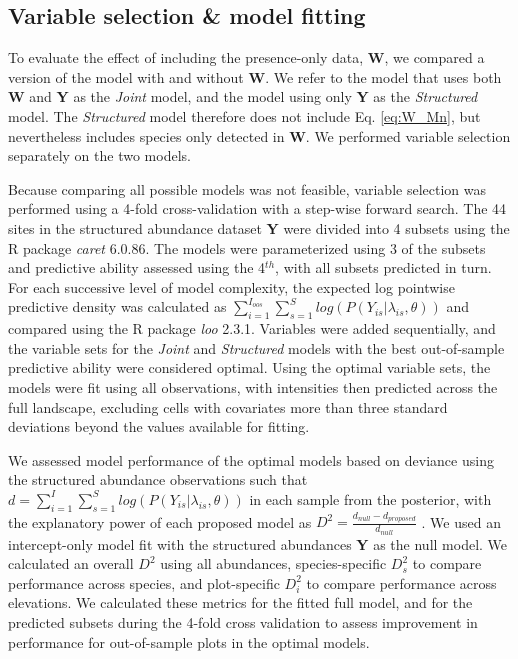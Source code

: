 \documentclass[preprint,final,times,12pt,3p]{elsarticle}
\begin{document}
\subsection{Variable selection \& model fitting}
To evaluate the effect of including the presence-only data, \textbf{W}, we compared a version of the model with and without \textbf{W}. We refer to the model that uses both \textbf{W} and \textbf{Y} as the \emph{Joint} model, and the model using only \textbf{Y} as the \emph{Structured} model. The \emph{Structured} model therefore does not include Eq. \ref{eq:W_Mn}, but nevertheless includes species only detected in \textbf{W}. We performed variable selection separately on the two models.

Because comparing all possible models was not feasible, variable selection was performed using a 4-fold cross-validation with a step-wise forward search. The 44 sites in the structured abundance dataset \textbf{Y} were divided into 4 subsets using the R package \emph{caret} 6.0.86. The models were parameterized using 3 of the subsets and predictive ability assessed using the 4$^{th}$, with all subsets predicted in turn. For each successive level of model complexity, the expected log pointwise predictive density was calculated as $\sum_{i=1}^{I_{oos}}\sum_{s=1}^S log(P(Y_{is} | \lambda_{is}, \theta))$ and compared using the R package \emph{loo} 2.3.1. Variables were added sequentially, and the variable sets for the \emph{Joint} and \emph{Structured} models with the best out-of-sample predictive ability were considered optimal. Using the optimal variable sets, the models were fit using all observations, with intensities then predicted across the full landscape, excluding cells with covariates more than three standard deviations beyond the values available for fitting.

We assessed model performance of the optimal models based on deviance using the structured abundance observations such that $d = \sum_{i=1}^{I}\sum_{s=1}^S log(P(Y_{is} | \lambda_{is}, \theta))$ in each sample from the posterior, with the explanatory power of each proposed model as $D^2 = \frac{d_{null} - d_{proposed}}{d_{null}}$ \citep{Caradima2019,Guisan2000}. We used an intercept-only model fit with the structured abundances \textbf{Y} as the null model. We calculated an overall $D^2$ using all abundances, species-specific $D^2_s$ to compare performance across species, and plot-specific $D^2_i$ to compare performance across elevations. We calculated these metrics for the fitted full model, and for the predicted subsets during the 4-fold cross validation to assess improvement in performance for out-of-sample plots in the optimal models.
\end{document}
